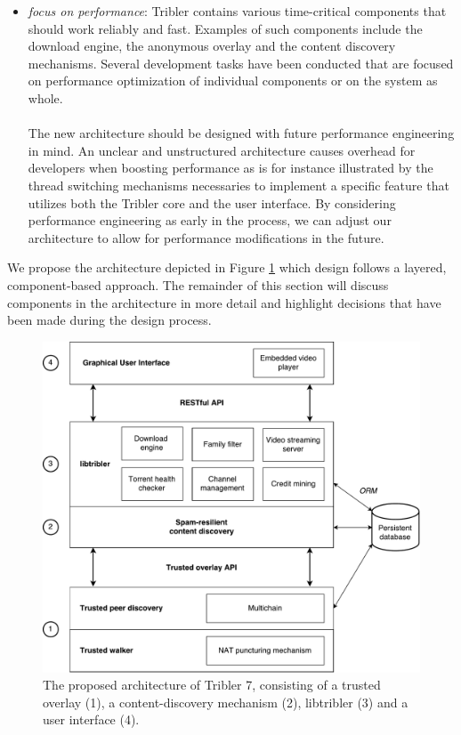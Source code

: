 \begin{itemize}
	\item \emph{focus on performance}: Tribler contains various time-critical components that should work reliably and fast. Examples of such components include the download engine, the anonymous overlay and the content discovery mechanisms. Several development tasks have been conducted that are focused on performance optimization of individual components or on the system as whole.\\\\
	The new architecture should be designed with future performance engineering in mind. An unclear and unstructured architecture causes overhead for developers when boosting performance as is for instance illustrated by the thread switching mechanisms necessaries to implement a specific feature that utilizes both the Tribler core and the user interface. By considering performance engineering as early in the process, we can adjust our architecture to allow for performance modifications in the future.
\end{itemize}
We propose the architecture depicted in Figure \ref{fig:tribler7} which design follows a layered, component-based approach. The remainder of this section will discuss components in the architecture in more detail and highlight decisions that have been made during the design process.

\begin{figure}[h!]
	\centering
	\includegraphics[width=0.9\columnwidth]{images/architecture/tribler7}
	\caption{The proposed architecture of Tribler 7, consisting of a trusted overlay (1), a content-discovery mechanism (2), libtribler (3) and a user interface (4).}
	\label{fig:tribler7}
\end{figure}

